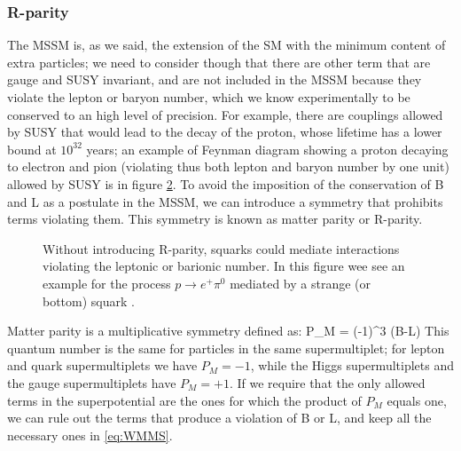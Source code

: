 \begin{figure}
\begin{center}
\end{center}
\caption{}
\label{fig:topint2}
\end{figure}


\subsubsection{R-parity}
\label{sec:rpar}
The MSSM is, as we said, the extension of the SM with the minimum content of extra particles; we need to consider though that there are other term that are gauge and SUSY invariant, and are not included in the MSSM because they violate the lepton or baryon number, which we know experimentally to be conserved to an high level of precision. For example, there are couplings allowed by SUSY that would lead to the decay of the proton, whose lifetime has a lower bound at $10^{32}$ years; an example of Feynman diagram showing a proton decaying to electron and pion (violating thus both lepton and baryon number by one unit) allowed by SUSY is in figure \ref{fig:Rpar}. To avoid the imposition of the conservation of B and L as a postulate in the MSSM, we can introduce a symmetry that prohibits terms violating them. This symmetry is known as matter parity or R-parity. 

\begin{figure}
\begin{center}
\end{center}
\caption[R-parity violating process]{Without introducing R-parity, squarks could mediate interactions violating the leptonic or barionic number. In this figure wee see an example for the process $p \rightarrow e^+ \pi^0$ mediated by a strange (or bottom) squark \cite{martin:primer}.}
\label{fig:Rpar}
\end{figure}

Matter parity is a multiplicative symmetry defined as:
\beq
P_M = (-1)^{3 (B-L)} 
\label{eq:defmatterparity}
\eeq
This quantum number is the same for particles in the same supermultiplet; for lepton and quark supermultiplets we have $P_M =-1$, while the Higgs supermultiplets and the gauge supermultiplets have $P_M =+1$. If we require that the only allowed terms in the superpotential are the ones for which the product of $P_M$ equals one, we can rule out the terms that produce a violation of B or L, and keep all the necessary ones in \ref{eq:WMMS}. 

